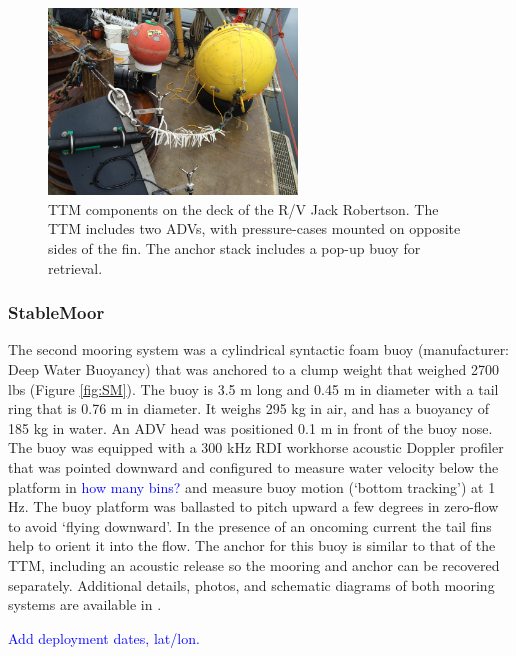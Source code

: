 \documentclass[twocol]{ametsoc}
\newcommand{\note}[1]{\textcolor{blue}{#1}}
\begin{document}
\begin{figure}[t]
  \centering
  \includegraphics[width=2.6in]{TTM_image01}  
  \caption{TTM components on the deck of the R/V Jack Robertson. The TTM includes two ADVs, with pressure-cases mounted on opposite sides of the fin. The anchor stack includes a pop-up buoy for retrieval. }
  \label{fig:ttm:photo}
\end{figure}

\subsubsection{StableMoor}

The second mooring system was a cylindrical syntactic foam buoy (manufacturer: Deep Water Buoyancy) that was anchored to a clump weight that weighed 2700 lbs (Figure \ref{fig:SM}). The buoy is 3.5 m long and 0.45 m in diameter with a tail ring that is 0.76 m in diameter. It weighs 295 kg in air, and has a buoyancy of 185 kg in water. An ADV head was positioned 0.1 m in front of the buoy nose.  The buoy was equipped with a 300 kHz RDI workhorse acoustic Doppler profiler that was pointed downward and configured to measure water velocity below the platform in \note{how many bins?} and measure buoy motion (`bottom tracking') at 1 Hz. The buoy platform was ballasted to pitch upward a few degrees in zero-flow to avoid `flying downward'. In the presence of an oncoming current the tail fins help to orient it into the flow. The anchor for this buoy is similar to that of the TTM, including an acoustic release so the mooring and anchor can be recovered separately. Additional details, photos, and schematic diagrams of both mooring systems are available in \cite{Harding_MotionPaper}.

\note{Add deployment dates, lat/lon.}
\end{document}
